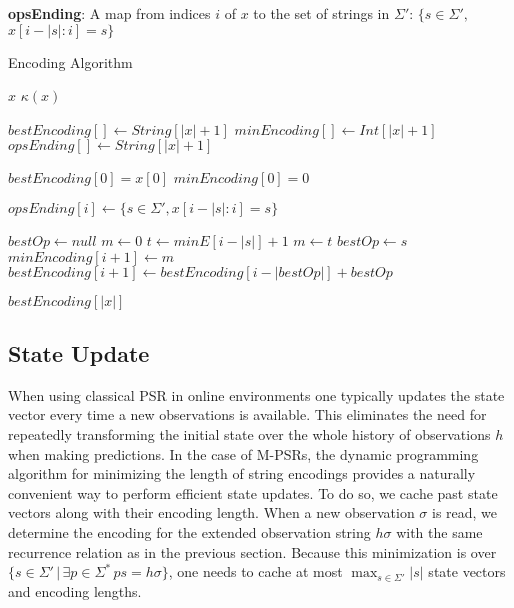 \textbf{opsEnding}: A map from indices $i$ of $x$ to the set of strings in $\Sigma'$: $\{s \in \Sigma',$ $x[i-|s|:i] = s\}$

\algnewcommand{}
\algnewcommand{}

\algnewcommand\INPUT{\item[\algorithmicinput]}
\algnewcommand\OUTPUT{\item[\algorithmicoutput]}

\begin{algorithm}
\caption{Encoding Algorithm}
\label{Encoding Algorithm}
\begin{algorithmic}[1]
\INPUT $x$
\OUTPUT $\kappa(x)$


\State $bestEncoding[] \gets String[|x|+1]$
\State $minEncoding[] \gets Int[|x|+1]$
\State $opsEnding[] \gets String[|x|+1]$

\State $bestEncoding[0] = x[0]$
\State $minEncoding[0] = 0$

	 \State $opsEnding[i] \gets \{s \in \Sigma', x[i-|s|:i] = s\}$
\EndFor

	\State $bestOp \gets null$
	\State $m \gets 0$ 
		\State $t \gets minE[i-|s|] + 1$
			\State $m \gets t$ 
			\State $bestOp \gets s$
		\EndIf
	\EndFor
	\State $minEncoding[i+1] \gets m$
	\State $bestEncoding[i+1] \gets bestEncoding[i-|bestOp|] + bestOp$
\EndFor

\State \Return $bestEncoding[|x|]$

\EndProcedure
\end{algorithmic}
\end{algorithm}


\subsection{State Update}

When using classical PSR in online environments one typically updates the state vector every time a new observations is available. This eliminates the need for repeatedly transforming the initial state over the whole history of observations $h$ when making predictions. In the case of M-PSRs, the dynamic programming algorithm for minimizing the length of string encodings provides a naturally convenient way to perform efficient state updates. To do so, we cache past state vectors along with their encoding length. When a new observation $\sigma$ is read, we determine the encoding for the extended observation string $h \sigma$ with the same recurrence relation as in the previous section. Because this minimization is over $\{s \in \Sigma' \,|\, \exists p \in \Sigma^* \, ps= h\sigma\}$, one needs to cache at most $\max_{s \in \Sigma'} |s|$ state vectors and encoding lengths. 

